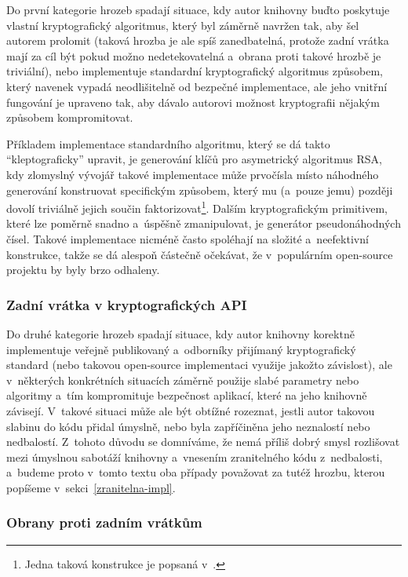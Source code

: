 Do první kategorie hrozeb spadají situace, kdy autor knihovny buďto poskytuje vlastní kryptografický algoritmus, který byl záměrně navržen tak, aby šel autorem prolomit (taková hrozba je ale spíš zanedbatelná, protože zadní vrátka mají za cíl být pokud možno nedetekovatelná a~obrana proti takové hrozbě je triviální), nebo implementuje standardní kryptografický algoritmus způsobem, který navenek vypadá neodlišitelně od bezpečné implementace, ale jeho vnitřní fungování je upraveno tak, aby dávalo autorovi možnost kryptografii nějakým způsobem kompromitovat.

Příkladem implementace standardního algoritmu, který se dá takto ``kleptograficky'' upravit, je generování klíčů pro asymetrický algoritmus RSA, kdy zlomyslný vývojář takové implementace může prvočísla místo náhodného generování konstruovat specifickým způsobem, který mu (a~pouze jemu) později dovolí triviálně jejich součin faktorizovat\footnote{Jedna taková konstrukce je popsaná v~\cite{crypto-backdoors}.}. Dalším kryptografickým primitivem, které lze poměrně snadno a~úspěšně zmanipulovat, je generátor pseudonáhodných čísel. Takové implementace nicméně často spoléhají na složité a~neefektivní konstrukce, takže se dá alespoň částečně očekávat, že v~populárním open-source projektu by byly brzo odhaleny.~\cite{crypto-backdoors}

\subsubsection{Zadní vrátka v kryptografických API}

Do druhé kategorie hrozeb spadají situace, kdy autor knihovny korektně implementuje veřejně publikovaný a~odborníky přijímaný kryptografický standard (nebo takovou open-source implementaci využije jakožto závislost), ale v~některých konkrétních situacích záměrně použije slabé parametry nebo algoritmy a~tím kompromituje bezpečnost aplikací, které na jeho knihovně závisejí. V~takové situaci může ale být obtížné rozeznat, jestli autor takovou slabinu do kódu přidal úmyslně, nebo byla zapříčiněna jeho neznalostí nebo nedbalostí. Z~tohoto důvodu se domníváme, že nemá příliš dobrý smysl rozlišovat mezi úmyslnou sabotáží knihovny a~vnesením zranitelného kódu z~nedbalosti, a~budeme proto v~tomto textu oba případy považovat za tutéž hrozbu, kterou popíšeme v~sekci~\ref{zranitelna-impl}.

\subsubsection{Obrany proti zadním vrátkům}

